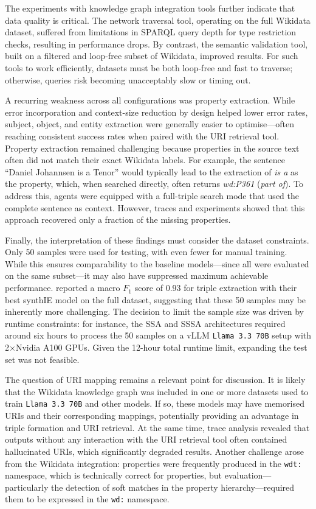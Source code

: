\documentclass[a4paper,oneside,bibliography=totoc]{scrbook}
\begin{document}
The experiments with knowledge graph integration tools further indicate that data quality is critical. The network traversal tool, operating on the full Wikidata dataset, suffered from limitations in SPARQL query depth for type restriction checks, resulting in performance drops. By contrast, the semantic validation tool, built on a filtered and loop-free subset of Wikidata, improved results. For such tools to work efficiently, datasets must be both loop-free and fast to traverse; otherwise, queries risk becoming unacceptably slow or timing out.

A recurring weakness across all configurations was property extraction. While error incorporation and context-size reduction by design helped lower error rates, subject, object, and entity extraction were generally easier to optimise—often reaching consistent success rates when paired with the URI retrieval tool. Property extraction remained challenging because properties in the source text often did not match their exact Wikidata labels. For example, the sentence \enquote{Daniel Johannsen is a Tenor} would typically lead to the extraction of \textit{is a} as the property, which, when searched directly, often returns \textit{wd:P361} (\textit{part of}). To address this, agents were equipped with a full-triple search mode that used the complete sentence as context. However, traces and experiments showed that this approach recovered only a fraction of the missing properties.

Finally, the interpretation of these findings must consider the dataset constraints. Only 50 samples were used for testing, with even fewer for manual training. While this ensures comparability to the baseline models—since all were evaluated on the same subset—it may also have suppressed maximum achievable performance. \citet{Josifoski2023} reported a macro $F_{1}$ score of 0.93 for triple extraction with their best synthIE model on the full dataset, suggesting that these 50 samples may be inherently more challenging. The decision to limit the sample size was driven by runtime constraints: for instance, the \ac{SSA} and \ac{SSSA} architectures required around six hours to process the 50 samples on a vLLM \texttt{Llama~3.3~70B} setup with 2$\times$Nvidia A100 GPUs. Given the 12-hour total runtime limit, expanding the test set was not feasible.

The question of URI mapping remains a relevant point for discussion. It is likely that the Wikidata knowledge graph was included in one or more datasets used to train \texttt{Llama~3.3~70B} and other models. If so, these models may have memorised URIs and their corresponding mappings, potentially providing an advantage in triple formation and URI retrieval. At the same time, trace analysis revealed that outputs without any interaction with the URI retrieval tool often contained hallucinated URIs, which significantly degraded results. Another challenge arose from the Wikidata integration: properties were frequently produced in the \texttt{wdt:} namespace, which is technically correct for properties, but evaluation—particularly the detection of soft matches in the property hierarchy—required them to be expressed in the \texttt{wd:} namespace.
\end{document}
